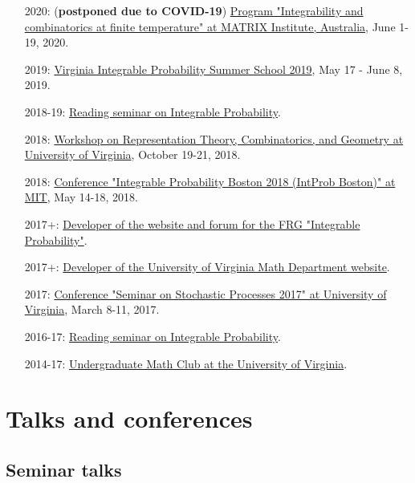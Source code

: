 \documentclass[letterpaper,11pt]{article}
\begin{document}
\begin{itemize}
\item [2020:]
(\textbf{postponed due to COVID-19})
\href{https://www.matrix-inst.org.au/events/integrability-and-combinatorics-at-finite-temperature/}{Program "Integrability and combinatorics at finite temperature" at MATRIX Institute, Australia},
June 1-19, 2020.

\item [2019:]
\href{http://vipss.int-prob.org/}{Virginia Integrable Probability Summer School 2019},
May 17 - June 8, 2019.

\item[2018-19:]
\href{https://lpetrov.cc/reading-2019/}{Reading seminar on Integrable Probability}.

\item [2018:]
\href{http://math.virginia.edu/ims/workshop-fall-2018/}{Workshop on Representation Theory, Combinatorics, and Geometry at University of Virginia},
October 19-21, 2018.

\item [2018:]
\href{http://frg.int-prob.org/conference2018/}{Conference "Integrable Probability Boston 2018 (IntProb Boston)" at MIT},
May 14-18, 2018.

\item [2017+:]
\href{http://frg.int-prob.org/}{Developer of the website and forum for the FRG "Integrable Probability"}.

\item [2017+:]
\href{http://math.virginia.edu/}{Developer of the University of Virginia Math Department website}.

\item [2017:]
\href{http://faculty.virginia.edu/ssp17/}{Conference "Seminar on Stochastic Processes 2017" at University of Virginia},
March 8-11, 2017.

\item [2016-17:]
\href{https://lpetrov.cc/2016/12/reading-seminar/}{Reading seminar on Integrable Probability}.

\item [2014-17:]
\href{http://math.virginia.edu/seminars/mathclub/}{Undergraduate Math Club at the University of Virginia}.
\end{itemize}

\section*{Talks and conferences}

\subsection*{Seminar talks}
\end{document}
